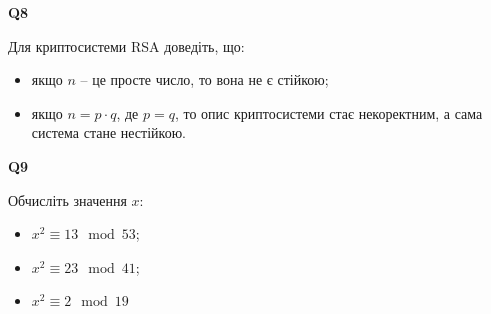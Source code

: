 \documentclass{../../test-template}
\begin{document}
\begin{tcolorbox}[lowerbox=invisible,colback=white]
    \begin{minipage}{0.1\textwidth}
        \raggedright
        \vspace*{\fill}
            \textbf{Q8}
        \vspace*{\fill}
        \end{minipage}
        \begin{minipage}{0.75\textwidth}
        Для криптосистеми RSA доведіть, що:
        \begin{itemize}
            \item якщо $n$ -- це просте число, то вона не є стійкою;
            \item якщо $n=p\cdot q$, де $p=q$, то опис криптосистеми стає некоректним, а сама система стане нестійкою.
        \end{itemize}
        \end{minipage}
\end{tcolorbox}

\begin{tcolorbox}[lowerbox=invisible,colback=white]
    \begin{minipage}{0.1\textwidth}
        \raggedright
        \vspace*{\fill}
            \textbf{Q9}
        \vspace*{\fill}
        \end{minipage}
        \begin{minipage}{0.75\textwidth}
        Обчисліть значення $x$:
        \begin{itemize}
            \item $x^2\equiv 13 \mod 53$;
            \item $x^2\equiv 23 \mod 41$;
            \item $x^2\equiv 2\mod 19$
        \end{itemize}
        \end{minipage}
\end{tcolorbox}
\end{document}
